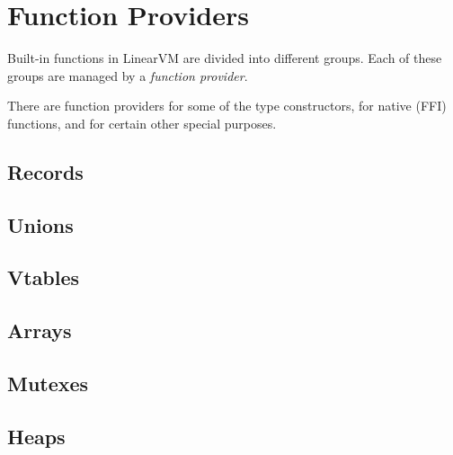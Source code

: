 \documentclass[a4paper]{report}
\begin{document}
\chapter{Function Providers}
Built-in functions in LinearVM are divided into different groups.
Each of these groups are managed by a \emph{function provider}.

There are function providers for some of the type constructors, for
native (FFI) functions, and for certain other special purposes.


\section{Records}

\section{Unions}

\section{Vtables}

\section{Arrays}
%

\section{Mutexes}
\section{Heaps}
\end{document}
